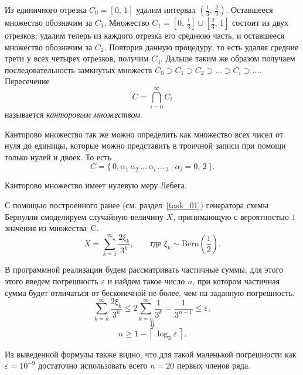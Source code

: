 \begin{definition}
        Из единичного отрезка $C_0 = [0,\,1]$ удалим интервал $\left(\frac13,\,\frac23\right)$. Оставшееся множество обозначим за $C_1$. Множество $C_1 = \left[0,\,\frac13\right]\cup\left[\frac23,\,1\right]$ состоит из двух отрезков; удалим теперь из каждого отрезка его среднюю часть, и оставшееся множество обозначим за $C_2$. Повторив данную процедуру, то есть удаляя средние трети у всех четырех отрезков, получим $C_3$. Дальше таким же образом получаем последовательность замкнутых множеств $C_0 \supset C_1 \supset C_2 \supset \ldots \supset C_i \supset \ldots$. Пересечение
        $$
                C = \bigcap_{i=0}^{\infty} C_i
        $$
        называется \textit{канторовым множеством}.
\end{definition}
\begin{remark}
        Канторово множество так же можно определить как множество всех чисел от нуля до единицы, которые можно представить в троичной записи при помощи только нулей и двоек. То есть
        $$
                C = \{\,0,\alpha_1\,\alpha_2\,\ldots\,\alpha_i\,\ldots\,_3\:|\:\alpha_i=0,\,2\,\}.
        $$
\end{remark}
\begin{assertion}
        Канторово множество имеет нулевую меру Лебега. \cite{shiryaev}
\end{assertion}

С помощью построенного ранее (см. раздел~\ref{task_01}) генератора схемы Бернулли смоделируем случайную величину $X$, принимающую с вероятностью $1$ значения из множества~C.
$$
        X = \sum_{k = 1}^{\infty}\frac{2\xi_k}{3^k},
        \qquad
        \mbox{где $\xi_k\sim\mbox{Bern}\left(\frac12\right)$.}
$$

В программной реализации будем рассматривать частичные суммы, для этого этого введем погрешность $\varepsilon$ и найдем такое число $n$, при котором частичная сумма будет отличаться от бесконечной не более, чем на заданную погрешность.
$$
        \sum_{k=n}^{\infty} \frac{2\xi_k}{3^k} \leqslant 2\sum_{k=n}^{\infty}\frac{1}{3^k} = \frac{1}{3^{n-1}} \leqslant \varepsilon,
$$
$$
        \Downarrow
$$
$$
        n \geqslant 1 - \left\lceil\,\log_3 \varepsilon\,\right\rceil.
$$
\begin{remark}
        Из выведенной формулы также видно, что для такой маленькой погрешности как $\varepsilon = 10^{-9}$ достаточно использовать всего $n = 20$ первых членов ряда.
\end{remark}